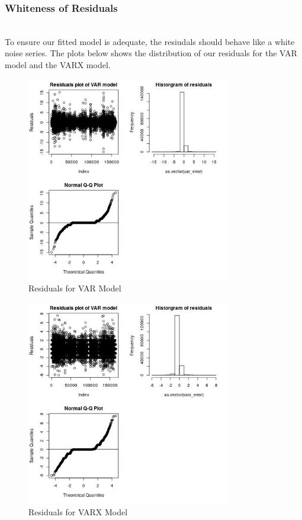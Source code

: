 \documentclass[nonblindrev,msom]{informs3} %
\begin{document}
\subsubsection{Whiteness of Residuals}
\hfill\\
To ensure our fitted model is adequate, the resiudals should behave like a white noise series. 
The plots below shows the distribution of our residuals for the VAR model and the VARX model. 

\begin{figure}[H]
    \centering
    \includegraphics[width=0.8\textwidth, height=0.42\textheight]{Images/Full_VAR_diff_resids.jpg}
    \caption{Residuals for VAR Model}
    \label{fig:Residuals for VAR Model}
\end{figure}

\begin{figure}[H]
    \centering
    \includegraphics[width=0.8\textwidth, height=0.42\textheight]{Images/Full_VARX_diff_resids.jpg}
    \caption{Residuals for VARX Model}
    \label{fig:Residuals for VARX Model}
\end{figure}
\end{document}
